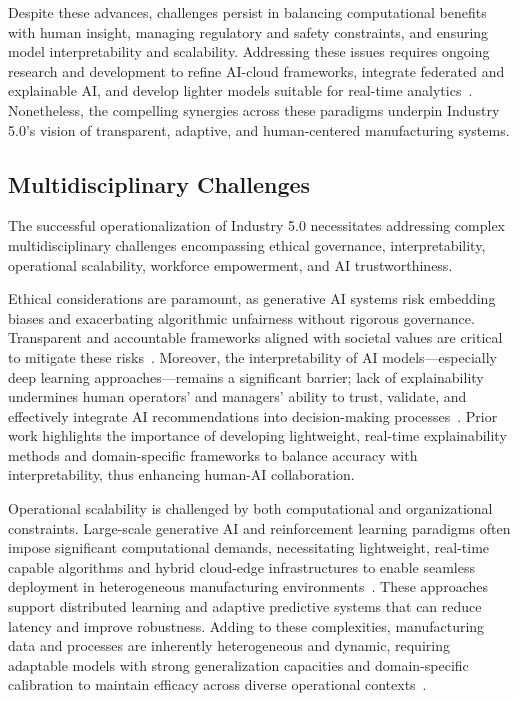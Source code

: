 \documentclass[sigconf]{acmart}
\begin{document}
Despite these advances, challenges persist in balancing computational benefits with human insight, managing regulatory and safety constraints, and ensuring model interpretability and scalability. Addressing these issues requires ongoing research and development to refine AI-cloud frameworks, integrate federated and explainable AI, and develop lighter models suitable for real-time analytics~\cite{ref12}. Nonetheless, the compelling synergies across these paradigms underpin Industry 5.0’s vision of transparent, adaptive, and human-centered manufacturing systems.

\subsection{Multidisciplinary Challenges}

The successful operationalization of Industry 5.0 necessitates addressing complex multidisciplinary challenges encompassing ethical governance, interpretability, operational scalability, workforce empowerment, and AI trustworthiness.

Ethical considerations are paramount, as generative AI systems risk embedding biases and exacerbating algorithmic unfairness without rigorous governance. Transparent and accountable frameworks aligned with societal values are critical to mitigate these risks~\cite{ref2,ref41}. Moreover, the interpretability of AI models—especially deep learning approaches—remains a significant barrier; lack of explainability undermines human operators’ and managers’ ability to trust, validate, and effectively integrate AI recommendations into decision-making processes~\cite{ref30}. Prior work highlights the importance of developing lightweight, real-time explainability methods and domain-specific frameworks to balance accuracy with interpretability, thus enhancing human-AI collaboration.

Operational scalability is challenged by both computational and organizational constraints. Large-scale generative AI and reinforcement learning paradigms often impose significant computational demands, necessitating lightweight, real-time capable algorithms and hybrid cloud-edge infrastructures to enable seamless deployment in heterogeneous manufacturing environments~\cite{ref19,ref37}. These approaches support distributed learning and adaptive predictive systems that can reduce latency and improve robustness. Adding to these complexities, manufacturing data and processes are inherently heterogeneous and dynamic, requiring adaptable models with strong generalization capacities and domain-specific calibration to maintain efficacy across diverse operational contexts~\cite{ref7,ref29}.
\end{document}
